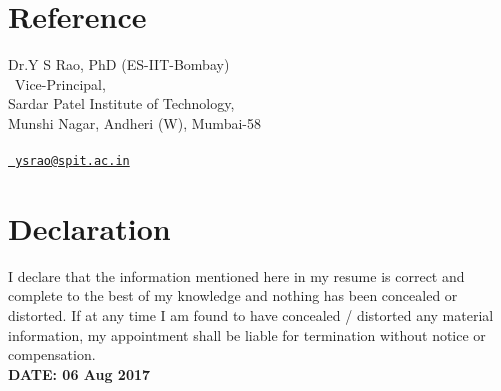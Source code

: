 \documentclass[10pt,a4paper,sans]{moderncv} %
\begin{document}


\section{Reference}
Dr.Y S Rao, PhD (ES-IIT-Bombay)    \\                                                                                    \
Vice-Principal,      \\                                                        
Sardar Patel Institute of Technology,       \\                  
Munshi Nagar, Andheri (W), Mumbai-58     \\    
 \\    
\emailsymbol \href{mailto: ysrao@spit.ac.in}{\nolinkurl{ ysrao@spit.ac.in} }\\




\section{Declaration}
 I declare that the information mentioned here in my resume is correct and complete to the best of my knowledge and nothing has been concealed or distorted. 
If at any time I am found to have concealed / distorted any material information, my appointment shall be liable for termination without notice or compensation. \\


\textbf{DATE: 06 Aug 2017}
\end{document}
